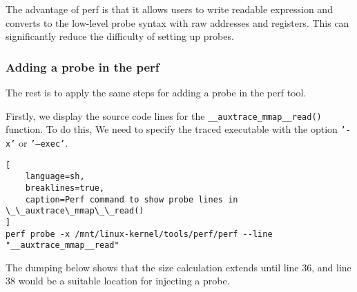 \documentclass[11pt]{diazessay} %
\def\code#1{\texttt{#1}}
\begin{document}
The advantage of perf is that it allows users to write readable expression and
converts to the low-level probe syntax with raw addresses and registers. This
can significantly reduce the difficulty of setting up probes.

\subsubsection*{Adding a probe in the perf}

The rest is to apply the same steps for adding a probe in the perf tool.

Firstly, we display the source code lines for the
\code{\_\_auxtrace\_mmap\_\_read()} function. To do this, We need to specify
the traced executable with the option \code{'-x'} or \code{'---exec'}.

\begin{lstlisting}[
  	language=sh,
	breaklines=true,
	caption=Perf command to show probe lines in \_\_auxtrace\_mmap\_\_read()
]
perf probe -x /mnt/linux-kernel/tools/perf/perf --line "__auxtrace_mmap__read"
\end{lstlisting}

The dumping below shows that the size calculation extends until line 36, and
line 38 would be a suitable location for injecting a probe.
\end{document}
